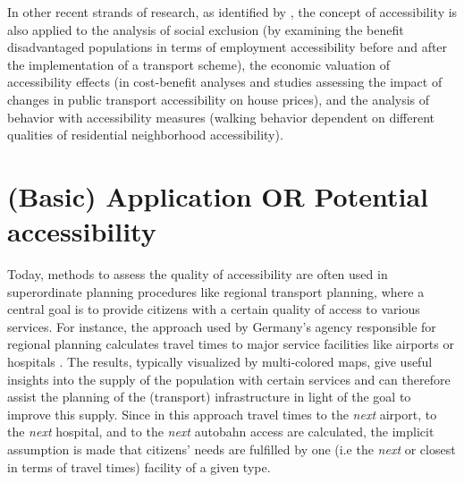In other recent strands of research, as identified by \citet{GeursEtAl2012AccessibilityTransportIntroduction}, the concept of 
accessibility is also applied to the analysis of social exclusion (\eg by examining the benefit 
disadvantaged populations in terms of employment accessibility before and after the implementation of a transport scheme), 
the economic valuation of accessibility effects (\eg in cost-benefit analyses and studies assessing the impact of changes in 
public transport accessibility on house prices), and the analysis of behavior with accessibility measures (\eg walking behavior 
dependent on different qualities of residential neighborhood accessibility).




\section{(Basic) Application OR Potential accessibility} 
Today, methods to assess the quality of accessibility
are often used in superordinate planning procedures like regional transport planning, where a central goal is to provide 
citizens with a certain quality of access to various services. For instance, the approach used by Germany's agency 
responsible for regional planning calculates travel times to major service facilities like airports or hospitals \citep{BBSR20xxErreichbarkeitsmodell}. %
The results, typically visualized by multi-colored maps, give useful insights into the supply of the population with 
certain services and can therefore assist the planning of the (transport) infrastructure in light of the goal to improve 
this supply.
Since in this approach travel times to the \textit{next} airport, to the \textit{next} hospital, and to the \textit{next} 
autobahn access are calculated, the implicit assumption is made that citizens' needs are fulfilled by one (i.e the \textit{next} 
or closest in terms of travel times) facility of a given type.

